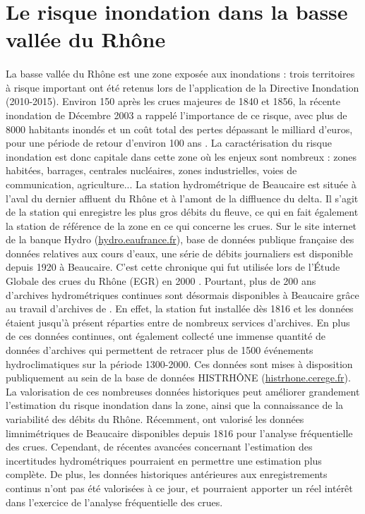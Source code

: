 \documentclass[11pt]{article}
\begin{document}
		
	\section{Le risque inondation dans la basse vallée du Rhône}
	
	\paragraph{} La basse vallée du Rhône est une zone exposée aux inondations : trois territoires à risque important ont été retenus lors de l'application de la Directive Inondation (2010-2015). Environ 150 après les crues majeures de 1840 et 1856, la récente inondation de Décembre 2003 a rappelé l'importance de ce risque, avec plus de 8000 habitants inondés et un coût total des pertes dépassant le milliard d'euros, pour une période de retour d'environ 100 ans \citep{medd_debit_2005}. La caractérisation du risque inondation est donc capitale dans cette zone où les enjeux sont nombreux : zones habitées, barrages, centrales nucléaires, zones industrielles, voies de communication, agriculture... La station hydrométrique de Beaucaire est située à l'aval du dernier affluent du Rhône et à l'amont de la diffluence du delta. Il s'agit de la station qui enregistre les plus gros débits du fleuve, ce qui en fait également la station de référence de la zone en ce qui concerne les crues. Sur le site internet de la banque Hydro (\url{hydro.eaufrance.fr}), base de données publique française des données relatives aux cours d'eaux, une série de débits journaliers est disponible depuis 1920 à Beaucaire. C'est cette chronique qui fut utilisée lors de l'Étude Globale des crues du Rhône (EGR) en 2000 \citep{rigaudiere_etude_2000}. Pourtant, plus de 200 ans d'archives hydrométriques continues sont désormais disponibles à Beaucaire grâce au travail d'archives de \citet{pichard_sept_2014}. En effet, la station fut installée dès 1816 et les données étaient jusqu'à présent réparties entre de nombreux services d'archives. En plus de ces données continues, \citet{pichard_sept_2014} ont également collecté une immense quantité de données d'archives qui permettent de retracer plus de 1500 événements hydroclimatiques sur la période 1300-2000. Ces données sont mises à disposition publiquement au sein de la base de données HISTRHÔNE (\url{histrhone.cerege.fr}). La valorisation de ces nombreuses données historiques peut améliorer grandement l'estimation du risque inondation dans la zone, ainsi que la connaissance de la variabilité des débits du Rhône. Récemment, \citet{bard_actualisation_2018} ont valorisé les données limnimétriques de Beaucaire disponibles depuis 1816 pour l'analyse fréquentielle des crues. Cependant, de récentes avancées concernant l'estimation des incertitudes hydrométriques pourraient en permettre une estimation plus complète. De plus, les données historiques antérieures aux enregistrements continus n'ont pas été valorisées à ce jour, et pourraient apporter un réel intérêt dans l'exercice de l'analyse fréquentielle des crues. 
	
\end{document}
